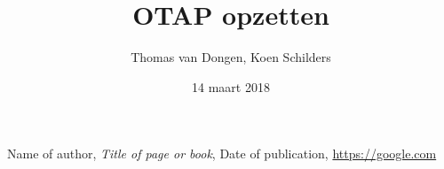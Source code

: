 \documentclass[12pt]{article}
\title{OTAP opzetten}
\author{Thomas van Dongen, Koen Schilders}
\date{14 maart 2018}
\begin{document}




\begin{titlepage}
\maketitle
\end{titlepage}

\begin{thebibliography}{9}
	Name of author,
	\textit{Title of page or book},
	Date of publication,
	\url{https://google.com}
\end{thebibliography}
\end{document}
